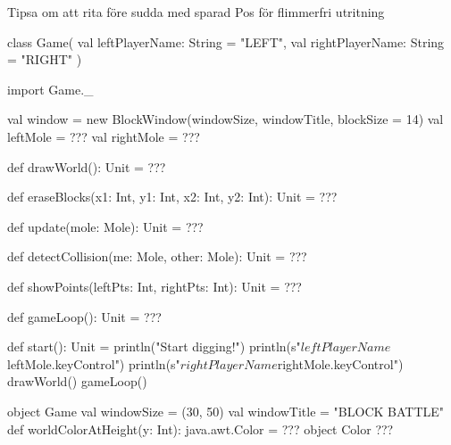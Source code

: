 \noindent\TODO Tipsa om att rita före sudda med sparad Pos för flimmerfri utritning

\begin{CodeSmall}
  class Game(
    val leftPlayerName: String = "LEFT",
    val rightPlayerName: String = "RIGHT"
  ) {
    import Game._

    val window    = new BlockWindow(windowSize, windowTitle, blockSize = 14)
    val leftMole  = ???
    val rightMole = ???

    def drawWorld(): Unit = ???

    def eraseBlocks(x1: Int, y1: Int, x2: Int, y2: Int): Unit = ???

    def update(mole: Mole): Unit = ???

   def detectCollision(me: Mole, other: Mole): Unit = ???

   def showPoints(leftPts: Int, rightPts: Int): Unit = ???

   def gameLoop(): Unit = ???

   def start(): Unit = {
     println("Start digging!")
     println(s"$leftPlayerName ${leftMole.keyControl}")
     println(s"$rightPlayerName ${rightMole.keyControl}")
     drawWorld()
     gameLoop()
   }
}

object Game {
  val windowSize = (30, 50)
  val windowTitle = "BLOCK BATTLE"
  def worldColorAtHeight(y: Int): java.awt.Color = ???
  object Color { ??? }
}
\end{CodeSmall}
